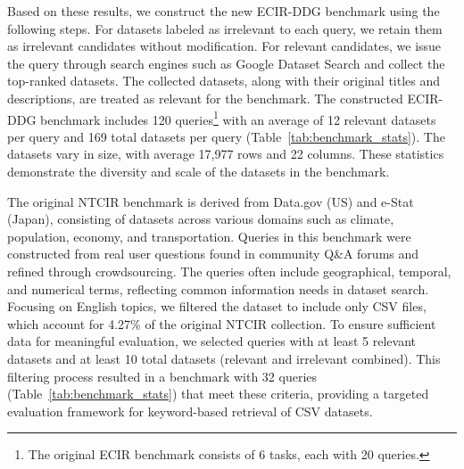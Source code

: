 Based on these results, we construct the new ECIR-DDG benchmark using the following steps. For datasets labeled as irrelevant to each query, we retain them as irrelevant candidates without modification. For relevant candidates, we issue the query through search engines such as Google Dataset Search and collect the top-ranked datasets. The collected datasets, along with their original titles and descriptions, are treated as relevant for the benchmark.
% 
The constructed ECIR-DDG benchmark includes 120 queries\footnote{The original ECIR benchmark consists of 6 tasks, each with 20 queries.} with an average of 12 relevant datasets per query and 169 total datasets per query (Table~\ref{tab:benchmark_stats}). The datasets vary in size, with average 17,977 rows and 22 columns. These statistics demonstrate the diversity and scale of the datasets in the benchmark.


The original NTCIR benchmark is derived from Data.gov (US) and e-Stat (Japan), consisting of datasets across various domains such as climate, population, economy, and transportation. Queries in this benchmark were constructed from real user questions found in community Q\&A forums and refined through crowdsourcing. The queries often include geographical, temporal, and numerical terms, reflecting common information needs in dataset search.
% 
%
% 
Focusing on English topics, we filtered the dataset to include only CSV files, which account for 4.27\% of the original NTCIR collection. 
% 
To ensure sufficient data for meaningful evaluation, we selected queries with at least 5 relevant datasets and at least 10 total datasets (relevant and irrelevant combined). This filtering process resulted in a benchmark with 32 queries (Table~\ref{tab:benchmark_stats}) that meet these criteria, providing a targeted evaluation framework for keyword-based retrieval of CSV datasets.



